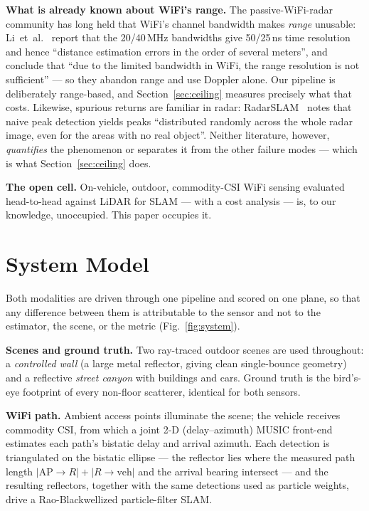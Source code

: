 \documentclass[journal]{IEEEtran}
\begin{document}
\textbf{What is already known about WiFi's range.} The passive-WiFi-radar community has
long held that WiFi's channel bandwidth makes \emph{range} unusable: Li~et~al.\
\cite{li2021csipwr} report that the 20/40\,MHz bandwidths give 50/25\,ns time resolution and
hence ``distance estimation errors in the order of several meters'', and conclude that ``due
to the limited bandwidth in WiFi, the range resolution is not sufficient'' --- so they abandon
range and use Doppler alone. Our pipeline is deliberately range-based, and
Section~\ref{sec:ceiling} measures precisely what that costs. Likewise, spurious returns are
familiar in radar: RadarSLAM~\cite{hong2022radarslam} notes that naive peak detection yields
peaks ``distributed randomly across the whole radar image, even for the areas with no real
object''. Neither literature, however, \emph{quantifies} the phenomenon or separates it from
the other failure modes --- which is what Section~\ref{sec:ceiling} does.

\textbf{The open cell.} On-vehicle, outdoor, commodity-CSI WiFi sensing evaluated
head-to-head against LiDAR for SLAM --- with a cost analysis --- is, to our knowledge,
unoccupied. This paper occupies it.

\section{System Model}\label{sec:method}

Both modalities are driven through one pipeline and scored on one plane, so that any
difference between them is attributable to the sensor and not to the estimator, the
scene, or the metric (Fig.~\ref{fig:system}).

\textbf{Scenes and ground truth.} Two ray-traced outdoor scenes are used throughout: a
\emph{controlled wall} (a large metal reflector, giving clean single-bounce geometry)
and a reflective \emph{street canyon} with buildings and cars. Ground truth is the
bird's-eye footprint of every non-floor scatterer, identical for both sensors.

\textbf{WiFi path.} Ambient access points illuminate the scene; the vehicle receives
commodity CSI, from which a joint 2-D (delay--azimuth) MUSIC front-end estimates each
path's bistatic delay and arrival azimuth. Each detection is triangulated on the bistatic
ellipse --- the reflector lies where the measured path length
$|\mathrm{AP}\!\rightarrow\!R| + |R\!\rightarrow\!\mathrm{veh}|$ and the arrival bearing
intersect --- and the resulting reflectors, together with the same detections used as
particle weights, drive a Rao-Blackwellized particle-filter SLAM.
\end{document}
